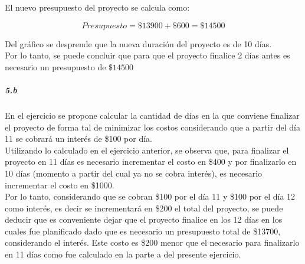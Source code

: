 \documentclass[a4paper,10pt]{article}
\begin{document}
El nuevo presupuesto del proyecto se calcula como:

$$ Presupuesto = \$13900 + \$600 = \$14500 $$

Del gr\'afico se desprende que la nueva duraci\'on del proyecto es de 10 d\'ias.\\

Por lo tanto, se puede concluir que para que el proyecto finalice 2 d\'ias antes es necesario un presupuesto de $\$14500$

\subparagraph {5.b}

En el ejercicio se propone calcular la cantidad de d\'ias en la que conviene finalizar el proyecto de forma tal de minimizar los costos considerando que a partir del d\'ia 11 se cobrar\'a un inter\'es
de \$100 por d\'ia.\\
Utilizando lo calculado en el ejercicio anterior, se observa que, para finalizar el proyecto en 11 d\'ias es necesario incrementar el costo en \$400 y por finalizarlo en 10 d\'ias (momento a partir del cual ya no se 
cobra inter\'es), es necesario incrementar el costo en \$1000. \\

Por lo tanto, considerando que se cobran \$100 por el d\'ia 11 y \$100 por el d\'ia 12 como inter\'es, es decir se incrementar\'a en \$200 el total del proyecto, se puede deducir que 
es conveniente dejar que el proyecto finalice en los 12 d\'ias en los cuales fue planificado dado que es necesario un presupuesto total de \$13700, considerando el inter\'es. Este costo es 
\$200 menor que el necesario para finalizarlo en 11 d\'ias como fue calculado en la parte a del presente ejercicio.
\end{document}

